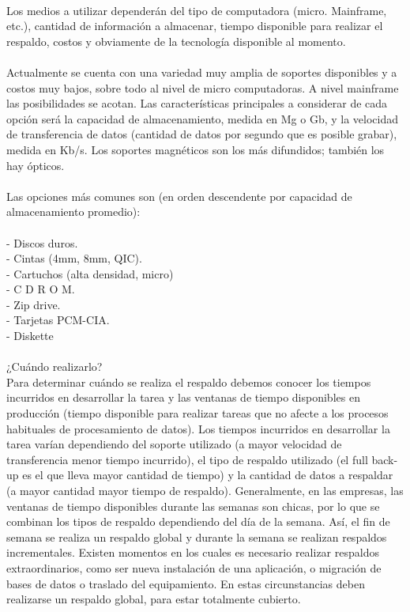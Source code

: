\begin{enumerate}[3.1.]
\\ Los medios a utilizar dependerán del tipo de computadora (micro. Mainframe, etc.), cantidad de información a almacenar, tiempo disponible para realizar el respaldo, costos y obviamente de la tecnología disponible al momento. 
\\ 
\\Actualmente se cuenta con una variedad muy amplia de soportes disponibles y a costos muy bajos, sobre todo al nivel de micro computadoras. A nivel mainframe las posibilidades se acotan. Las características principales a considerar de cada opción será la capacidad de almacenamiento, medida en Mg o Gb, y la velocidad de transferencia de datos (cantidad de datos por segundo que es posible grabar), medida en Kb/s. Los soportes magnéticos son los más difundidos; también los hay ópticos.  
\\
\\Las opciones más comunes son (en orden descendente por capacidad de almacenamiento promedio):  
\\
\\-	Discos duros.
\\-	Cintas (4mm, 8mm, QIC).
\\-	Cartuchos (alta densidad, micro)
\\-	C D R O M.
\\-	Zip drive.
\\-	Tarjetas PCM-CIA.
\\-	Diskette  
\\
\\¿Cuándo realizarlo? 
\\Para determinar cuándo se realiza el respaldo debemos conocer los tiempos incurridos en desarrollar la tarea y las ventanas de tiempo disponibles en producción (tiempo disponible para realizar tareas que no afecte a los procesos habituales de procesamiento de datos). Los tiempos incurridos en desarrollar la tarea varían dependiendo del soporte utilizado (a mayor velocidad de transferencia menor tiempo incurrido), el tipo de respaldo utilizado (el full back-up es el que lleva mayor cantidad de tiempo) y la cantidad de datos a respaldar (a mayor cantidad mayor tiempo de respaldo). 
Generalmente, en las empresas, las ventanas de tiempo disponibles durante las semanas son chicas, por lo que se combinan los tipos de respaldo  dependiendo del día de la semana. Así, el fin de semana se realiza un respaldo global y durante la semana se realizan respaldos incrementales. Existen momentos en los cuales es necesario realizar respaldos extraordinarios, como ser nueva instalación de una aplicación, o migración de bases de datos o traslado del equipamiento. En estas circunstancias deben realizarse un respaldo global, para estar totalmente cubierto. 

\end{enumerate}
